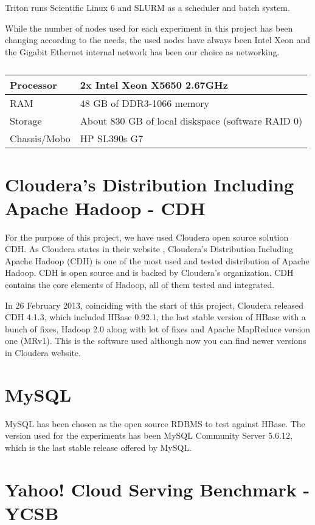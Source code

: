 Triton runs Scientific Linux 6 and SLURM as a scheduler and batch system.

\bigskip
While the number of nodes used for each experiment in this project has been changing according to the needs, the used nodes have always been Intel Xeon and the Gigabit Ethernet internal network has been our choice as networking. 

\begin{table}[htbp]
\caption{}
\begin{tabular}{|l|l|}
\hline
Processor &  2x Intel Xeon X5650 2.67GHz \\ \hline
RAM  & 48 GB of DDR3-1066 memory \\ \hline
Storage  & About 830 GB of local diskspace (software RAID 0) \\ \hline
Chassis/Mobo  & HP SL390s G7 \\ \hline
\end{tabular}
\label{}
\end{table}


\section{Cloudera's Distribution Including Apache Hadoop - CDH}
For the purpose of this project, we have used Cloudera \cite{Cloudera} open source solution CDH.
As Cloudera states in their website \cite{ClouderaCDH}, Cloudera's Distribution Including Apache Hadoop (CDH) is one of the most used and tested distribution of Apache Hadoop. CDH is open source and is backed by Cloudera's organization. CDH contains the core elements of Hadoop, all of them tested and integrated.
\par
In 26 February 2013, coinciding with the start of this project, Cloudera released CDH 4.1.3, which included HBase 0.92.1, the last stable version of HBase with a bunch of fixes, Hadoop 2.0 along with lot of fixes and Apache MapReduce version one (MRv1). This is the software used although now you can find newer versions in Cloudera website.

\section{MySQL}

MySQL \cite{MySQL} has been chosen as the open source RDBMS to test against HBase. The version used for the experiments has been MySQL Community Server 5.6.12, which is the last stable release offered by MySQL.

\section{Yahoo! Cloud Serving Benchmark - YCSB}

